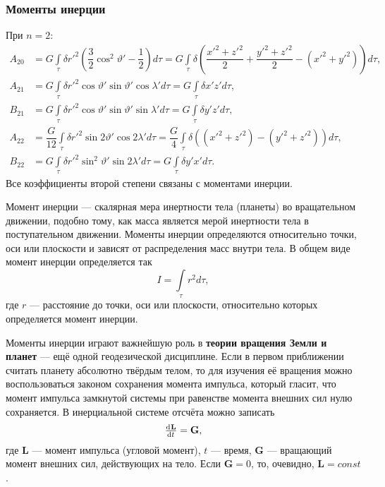 \documentclass[11pt, a4paper,addpoints]{exam}
\theoremstyle{remark}
\renewcommand{\theta}{\vartheta}
\begin{document}
    \subsubsection*{Моменты инерции}
    При $n = 2$:
    \begin{align*}
        A_{20} &= G \int\limits_\tau \delta r'^2 \left( \dfrac{3}{2}\cos^2{\theta'} - \dfrac{1}{2} \right)d\tau =
        G \int\limits_\tau \delta \left(\dfrac{x'^2 + z'^2}{2} + \dfrac{y'^2 + z'^2}{2} - \left(
        x'^2 + y'^2 \right)\right) d\tau, \\
        A_{21} &= G \int\limits_\tau \delta r'^2 \cos{\theta'}\sin{\theta'} \cos{\lambda'} d\tau =
        G\int\limits_\tau \delta x'z' d\tau, \\
        B_{21} &= G \int\limits_\tau \delta r'^2 \cos{\theta'}\sin{\theta'} \sin{\lambda'} d\tau =
        G\int\limits_\tau \delta y'z' d\tau, \\
        A_{22} &= \dfrac{G}{12} \int\limits_\tau \delta r'^2 \sin{2\theta'} \cos{2\lambda'} d\tau =
        \dfrac{G}{4}\int\limits_\tau \delta \left( \left( x'^2 + z'^2 \right) - 
        \left( y'^2 + z'^2 \right) \right)  d\tau, \\
        B_{22} &= G \int\limits_\tau \delta r'^2 \sin^2{\theta'} \sin{2\lambda'} d\tau =
        G\int\limits_\tau \delta y'x' d\tau.
    \end{align*}
    Все коэффициенты второй степени связаны с моментами инерции.

    Момент инерции --- скалярная мера инертности тела (планеты) во вращательном движении, подобно тому, как
    масса является мерой инертности тела в поступательном движении. Моменты инерции определяются
    относительно точки, оси или плоскости и зависят от распределения масс внутри тела. В общем виде
    момент инерции определяется так
    \begin{equation*}
        I = \int\limits_{\tau} r^2 d\tau,
    \end{equation*}
    где $r$ --- расстояние до точки, оси или плоскости, относительно которых определяется момент
    инерции.

    Моменты инерции играют важнейшую роль в \textbf{теории вращения Земли и планет} --- ещё
    одной геодезической дисциплине. Если в первом приближении считать планету абсолютно твёрдым
    телом, то для изучения её вращения можно воспользоваться законом сохранения момента
    импульса, который гласит, что момент импульса замкнутой системы при равенстве момента внешних
    сил нулю сохраняется. В инерциальной системе отсчёта можно записать
    \begin{equation*}
        \od{\mathbf{L}}{t} = \mathbf{G},
    \end{equation*}
    где $\mathbf{L}$ --- момент импульса (угловой момент), $t$ --- время, $\mathbf{G}$ --- 
    вращающий момент внешних сил, действующих на тело. Если $\mathbf{G} = 0$, 
    то, очевидно, $\mathbf{L} = const$. 
\end{document}

